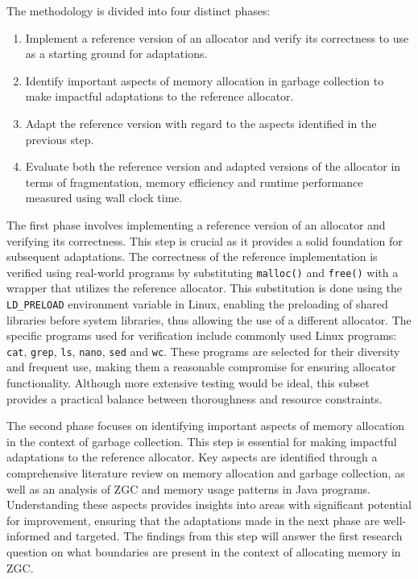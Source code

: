 
The methodology is divided into four distinct phases:

\begin{enumerate}
    \item Implement a reference version of an allocator and verify its correctness to use as a starting ground for adaptations.
    \item Identify important aspects of memory allocation in garbage collection to make impactful adaptations to the reference allocator.
    \item Adapt the reference version with regard to the aspects identified in the previous step.
    \item Evaluate both the reference version and adapted versions of the allocator in terms of fragmentation, memory efficiency and runtime performance measured using wall clock time.
\end{enumerate}

The first phase involves implementing a reference version of an allocator and verifying its correctness. This step is crucial as it provides a solid foundation for subsequent adaptations. The correctness of the reference implementation is verified using real-world programs by substituting \texttt{malloc()} and \texttt{free()} with a wrapper that utilizes the reference allocator. This substitution is done using the \texttt{LD\_PRELOAD} environment variable in Linux, enabling the preloading of shared libraries before system libraries, thus allowing the use of a different allocator. The specific programs used for verification include commonly used Linux programs: \texttt{cat}, \texttt{grep}, \texttt{ls}, \texttt{nano}, \texttt{sed} and \texttt{wc}. These programs are selected for their diversity and frequent use, making them a reasonable compromise for ensuring allocator functionality. Although more extensive testing would be ideal, this subset provides a practical balance between thoroughness and resource constraints.

The second phase focuses on identifying important aspects of memory allocation in the context of garbage collection. This step is essential for making impactful adaptations to the reference allocator. Key aspects are identified through a comprehensive literature review on memory allocation and garbage collection, as well as an analysis of ZGC and memory usage patterns in Java programs. Understanding these aspects provides insights into areas with significant potential for improvement, ensuring that the adaptations made in the next phase are well-informed and targeted. The findings from this step will answer the first research question on what boundaries are present in the context of allocating memory in ZGC.

